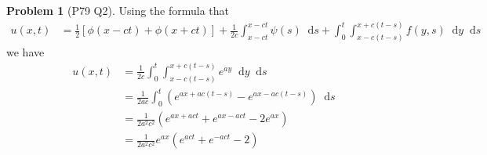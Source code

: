 \documentclass[twoside,11pt]{article}
\renewcommand*\d{\mathop{}\!\mathrm{d}}
\theoremstyle{definition}
\newtheorem{problem}{Problem}
\theoremstyle{remark}
\begin{document}
\begin{problem}[P79 Q2]
Using the formula that
\begin{align*}
    u(x,t) &= \frac{1}{2}[\phi(x-ct)+\phi(x+ct)]
    +\frac{1}{2c}\int_{x-ct}^{x-ct}\psi(s)\d s
    +\int_0^t\int_{x-c(t-s)}^{x+c(t-s)} f(y, s)\d y \d s
\end{align*}
we have
\begin{align*}
    u(x, t)&= \frac{1}{2c}\int_0^t\int_{x-c(t-s)}^{x+c(t-s)} e^{ay}\d y\d s\\
    &= \frac{1}{2ac}\int_0^t(
        e^{ax+ac(t-s)} - e^{ax-ac(t-s)}
    )\d s\\
    &= \frac{1}{2a^2c^2}(e^{ax+act}+e^{ax-act} - 2e^{ax})\\
    &= \frac{1}{2a^2c^2}e^{ax}(e^{act} + e^{-act} - 2)
\end{align*}
\end{problem}
\end{document}
